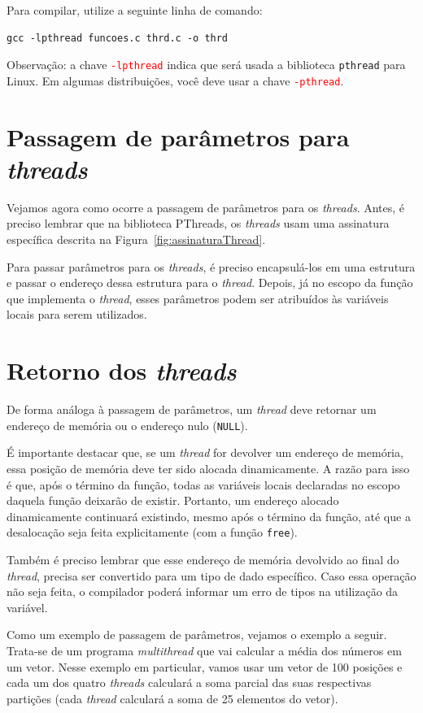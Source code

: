 Para compilar, utilize a seguinte linha de comando:

\begin{lstlisting}[style=MyBashStyle]
gcc -lpthread funcoes.c thrd.c -o thrd
\end{lstlisting}

\textcolor{orange}{\faExclamationTriangle} Observação: a chave \textcolor{red}{\texttt{-lpthread}} indica que será usada a biblioteca \texttt{pthread} para Linux. Em algumas distribuições, você deve usar a chave \textcolor{red}{\texttt{-pthread}}.

\section{Passagem de parâmetros para \textit{threads}}
Vejamos agora como ocorre a passagem de parâmetros para os \textit{threads}. Antes, é preciso lembrar que na biblioteca PThreads, os \textit{threads} usam uma assinatura específica descrita na Figura~\ref{fig:assinaturaThread}. 

Para passar parâmetros para os \textit{threads}, é preciso encapsulá-los em uma estrutura e passar o endereço dessa estrutura para o \textit{thread}. Depois, já no escopo da função que implementa o \textit{thread}, esses parâmetros podem ser atribuídos às variáveis locais para serem utilizados.

\section{Retorno dos \textit{threads}}
De forma análoga à passagem de parâmetros, um \textit{thread} deve retornar um endereço de memória ou o endereço nulo (\texttt{NULL}).  

É importante destacar que, se um \textit{thread} for devolver um endereço de memória, essa posição de memória deve ter sido alocada dinamicamente. A razão para isso é que, após o término da função, todas as variáveis locais declaradas no escopo daquela função deixarão de existir. Portanto, um endereço alocado dinamicamente continuará existindo, mesmo após o término da função, até que a desalocação seja feita explicitamente (com a função \texttt{free}).

Também é preciso lembrar que esse endereço de memória devolvido ao final do \textit{thread}, precisa ser convertido para um tipo de dado específico. Caso essa operação não seja feita, o compilador poderá informar um erro de tipos na utilização da variável.

Como um exemplo de passagem de parâmetros, vejamos o exemplo a seguir. Trata-se de um programa \textit{multithread} que vai calcular a média dos números em um vetor. Nesse exemplo em particular, vamos usar um vetor de 100 posições e cada um dos quatro \textit{threads} calculará a soma parcial das suas respectivas partições (cada \textit{thread} calculará a soma de 25 elementos do vetor).

